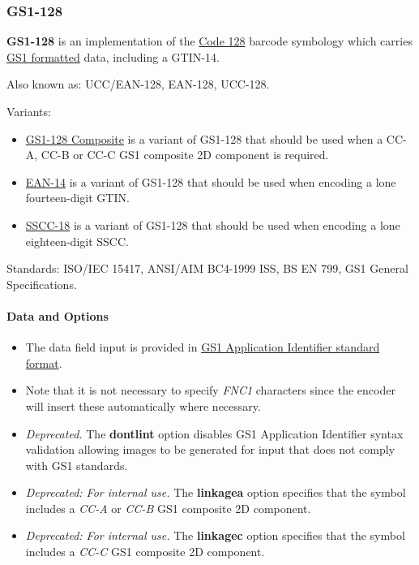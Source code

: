 \hypertarget{gs1-128}{%
\subsubsection{GS1-128}\label{gs1-128}}

\textbf{GS1-128} is an implementation of the
\protect\hyperlink{code-128}{Code 128} barcode symbology which carries
\protect\hyperlink{gs1-application-identifier-standard-format}{GS1
formatted} data, including a GTIN-14.

Also known as: UCC/EAN-128, EAN-128, UCC-128.

Variants:

\begin{itemize}
\tightlist
\item
  \protect\hyperlink{gs1-composite-symbols}{GS1-128 Composite} is a
  variant of GS1-128 that should be used when a CC-A, CC-B or CC-C GS1
  composite 2D component is required.
\item
  \protect\hyperlink{ean-14}{EAN-14} is a variant of GS1-128 that should
  be used when encoding a lone fourteen-digit GTIN.
\item
  \protect\hyperlink{sscc-18}{SSCC-18} is a variant of GS1-128 that
  should be used when encoding a lone eighteen-digit SSCC.
\end{itemize}

Standards: ISO/IEC 15417, ANSI/AIM BC4-1999 ISS, BS EN 799, GS1 General
Specifications.

\hypertarget{data-and-options-32}{%
\paragraph{Data and Options}\label{data-and-options-32}}

\begin{itemize}
\tightlist
\item
  The data field input is provided in
  \protect\hyperlink{gs1-application-identifier-standard-format}{GS1
  Application Identifier standard format}.
\item
  Note that it is not necessary to specify \emph{FNC1} characters since
  the encoder will insert these automatically where necessary.
\item
  \emph{Deprecated.} The \textbf{dontlint} option disables GS1
  Application Identifier syntax validation allowing images to be
  generated for input that does not comply with GS1 standards.
\item
  \emph{Deprecated: For internal use.} The \textbf{linkagea} option
  specifies that the symbol includes a \emph{CC-A} or \emph{CC-B} GS1
  composite 2D component.
\item
  \emph{Deprecated: For internal use.} The \textbf{linkagec} option
  specifies that the symbol includes a \emph{CC-C} GS1 composite 2D
  component.
\end{itemize}

